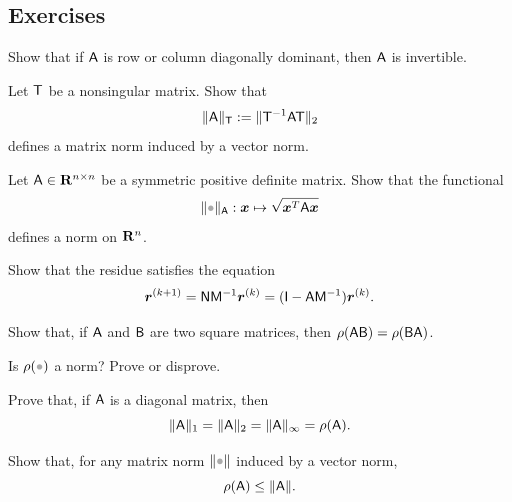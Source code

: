 \subsection{Exercises}%

\begin{exercise}
    \label{exercise:invertibility_diagonal_dominant}
    Show that if $\mathsf A$ is row or column diagonally dominant,
    then $\mathsf A$ is invertible.
\end{exercise}

\begin{exercise}
    Let $\mathsf T$ be a nonsingular matrix.
    Show that
    \[
        \lVert\mathsf A\rVert_{\mathsf T} := \lVert\mathsf T^{-1} \mathsf A \mathsf T\rVert_2
    \]
    defines a matrix norm induced by a vector norm.
\end{exercise}

\begin{exercise}
    \label{exercise:linear_norm_induced_A}
    Let $\mathsf A \in \mathbf R^{n \times n}$ be a symmetric positive definite matrix.
    Show that the functional
    \[
        \norm{\placeholder}_{\mat A}: \vect x \mapsto \sqrt{\vect x^\t \mat A \vect x}
    \]
    defines a norm on $\mathbf R^n$.
\end{exercise}

\begin{exercise}
    Show that the residue satisfies the equation
    \[
        \mathbf{\boldsymbol{r}}^{(k+1)} = \mathsf N \mathsf M^{-1} \mathbf{\boldsymbol{r}}^{(k)} = (\mathsf I - \mathsf A \mathsf M^{-1}) \mathbf{\boldsymbol{r}}^{(k)}.
    \]
\end{exercise}

\begin{exercise}
    Show that, if $\mathsf A$ and $\mathsf B$ are two square matrices,
    then $\rho(\mathsf A \mathsf B) = \rho(\mathsf B \mathsf A)$.
\end{exercise}

\begin{exercise}
    Is $\rho(\placeholder)$ a norm? Prove or disprove.
\end{exercise}

\begin{exercise}
    Prove that, if $\mathsf A$ is a diagonal matrix, then
    \[
        \lVert\mathsf A\rVert_1 = \lVert\mathsf A\rVert_2 = \lVert\mathsf A\rVert_{\infty} = \rho(\mathsf A).
    \]
\end{exercise}

\begin{exercise}
    Show that, for any matrix norm $\norm{\placeholder}$ induced by a vector norm,
    \[
        \rho(\mathsf A) \leq \lVert\mathsf A\rVert.
    \]
\end{exercise}

